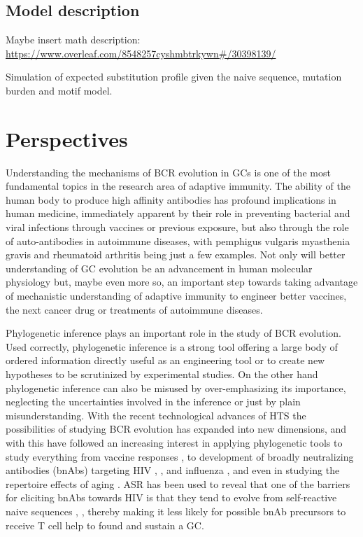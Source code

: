 \section{Model description}
Maybe insert math description:
\url{https://www.overleaf.com/8548257cyshmbtrkywn#/30398139/}




Simulation of expected substitution profile given the naive sequence, mutation burden and motif model.








\fi


\chapter{Perspectives}
Understanding the mechanisms of BCR evolution in GCs is one of the most fundamental topics in the research area of adaptive immunity.
The ability of the human body to produce high affinity antibodies has profound implications in human medicine, immediately apparent by their role in preventing bacterial and viral infections through vaccines or previous exposure, but also through the role of auto-antibodies in autoimmune diseases, with pemphigus vulgaris \cite{payne2005genetic} myasthenia gravis \cite{lindstrom1998antibody} and rheumatoid arthritis \cite{steiner2002autoantibodies} being just a few examples.
Not only will better understanding of GC evolution be an advancement in human molecular physiology but, maybe even more so, an important step towards taking advantage of mechanistic understanding of adaptive immunity to engineer better vaccines, the next cancer drug or treatments of autoimmune diseases.

Phylogenetic inference plays an important role in the study of BCR evolution.
Used correctly, phylogenetic inference is a strong tool offering a large body of ordered information directly useful as an engineering tool or to create new hypotheses to be scrutinized by experimental studies.
On the other hand phylogenetic inference can also be misused by over-emphasizing its importance, neglecting the uncertainties involved in the inference or just by plain misunderstanding.
With the recent technological advances of HTS the possibilities of studying BCR evolution has expanded into new dimensions, and with this have followed an increasing interest in applying phylogenetic tools to study everything from vaccine responses \cite{raymond2016influenza}, to development of broadly neutralizing antibodies (bnAbs) targeting HIV \cite{Doria-Rose2014-vi}, \cite{Wu2011-yj}, \cite{Zhu_undated-zz} and influenza \cite{pappas2014rapid}, \cite{xu2015key} and even in studying the repertoire effects of aging \cite{de2017phylogenetic}.
ASR has been used to reveal that one of the barriers for eliciting bnAbs towards HIV is that they tend to evolve from self-reactive naive sequences \cite{williams2017potent}, \cite{liao2011initial}, thereby making it less likely for possible bnAb precursors to receive T cell help to found and sustain a GC.

